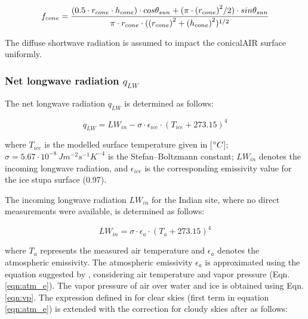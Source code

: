 \begin{equation}
	\begin{split}
		f_{cone}& =\frac{(0.5 \cdot r_{cone} \cdot h_{cone}) \cdot cos \theta_{sun} +(\pi \cdot
		{(r_{cone})}^2/2) \cdot sin \theta_{sun} }{\pi \cdot r_{cone} \cdot ({(r_{cone})}^2+{(h_{cone})}^2)^{1/2}}\\
	\end{split}
	\label{eqn:f_{cone} }
\end{equation}

The diffuse shortwave radiation is assumed to impact the conical\ac{AIR} surface uniformly.

\subsubsection{Net longwave radiation \texorpdfstring{$q_{LW}$}{Lg}} \label{sec:LW}

The net longwave radiation $q_{LW}$ is determined as follows:

\begin{equation}
	q_{LW}= LW_{in}-\sigma \cdot \epsilon_{ice} \cdot {(T_{ice}+ 273.15)}^4
	\label{eqn:LW}
\end{equation}

where $T_{ice}$ is the modelled surface temperature given in [$^{\circ} C$];
$\sigma=5.67\cdot10^{-8}\,Jm^{-2}s^{-1}K^{-4}$ is the Stefan–Boltzmann constant; $LW_{in}$ denotes the incoming
longwave radiation, and $\epsilon_{ice}$ is the corresponding emissivity value for the ice stupa surface (0.97).

The incoming longwave radiation $LW_{in}$ for the Indian site, where no direct measurements were available, is
determined as follows:

\begin{equation}
	LW_{in}=\sigma \cdot \epsilon_a \cdot {(T_a+ 273.15)}^4
	\label{eqn:LWin}
\end{equation}

where $T_a$ represents the measured air temperature and $\epsilon_a$ denotes the atmospheric emissivity. The atmospheric emissivity $\epsilon_a$ is approximated using the equation suggested by \cite{brutsaertEvaporationAtmosphereTheory1982},
considering air temperature and vapor pressure (Eqn.  \ref{eqn:atm_e}). The vapor pressure of air over water and
ice is obtained using Eqn. \ref{eqn:vp}.  The expression defined in \cite{brutsaertDerivableFormulaLongwave1975} for clear skies
(first term in equation \ref{eqn:atm_e}) is extended with the correction for cloudy skies after
\cite{brutsaertEvaporationAtmosphereTheory1982} as follows:

